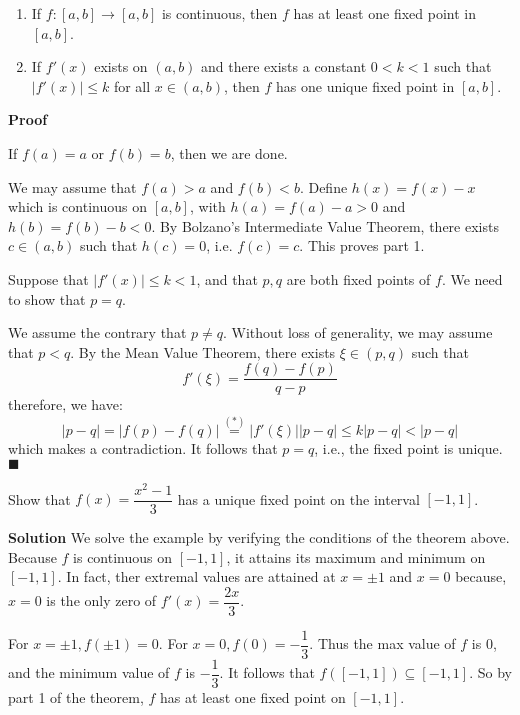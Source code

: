 \documentclass[main.tex]{subfiles}
\begin{document}
\begin{theorem}
    \begin{enumerate}
        \item If $f: [a, b] \rightarrow [a, b]$ is continuous, then $f$ has at least one fixed point in $[a, b]$.
        \item If $f'(x)$ exists on $(a, b)$ and there exists a constant $0 < k < 1$ such that $|f'(x)| \le k$ for all $x\in (a, b)$, then $f$ has one unique fixed point in $[a, b]$.
    \end{enumerate}
\end{theorem}
\par \noindent \textbf{Proof}
\par If $f(a) = a$ or $f(b) = b$, then we are done. 
\par We may assume that $f(a) > a$ and $f(b) < b$. Define $h(x) = f(x) - x$ which is continuous on $[a, b]$, with $h(a) = f(a) - a > 0$ and $h(b) = f(b) - b < 0$. By Bolzano's Intermediate Value Theorem, there exists $c\in (a, b)$ such that $h(c) = 0$, i.e. $f(c) = c$. This proves part 1.
\par Suppose that $|f'(x)|\le k < 1$, and that $p, q$ are both fixed points of $f$. We need to show that $p = q$. 
\par We assume the contrary that $p \neq q$. Without loss of generality, we may assume that $p < q$. By the Mean Value Theorem, there exists $\xi \in (p, q)$ such that
\begin{equation}
    f'(\xi) = \dfrac{f(q) - f(p)}{q - p}
\end{equation}
therefore, we have:
\begin{equation}
    |p - q| = |f(p) - f(q)| \overset{(*)}{=} |f'(\xi)||p - q| \le k |p - q| < |p - q|
\end{equation}
which makes a contradiction. It follows that $p = q$, i.e., the fixed point is unique. 
\\ \null \hfill $\blacksquare$ 
\begin{example}
    Show that $f(x) = \dfrac{x^2 - 1}{3}$ has a unique fixed point on the interval $[-1, 1]$.   
\end{example}
\par \noindent \textbf{Solution} We solve the example by verifying the conditions of the theorem above. Because $f$ is continuous on $[-1, 1]$, it attains its maximum and minimum on $[-1, 1]$. In fact, ther extremal values are attained at $x = \pm 1$ and $x = 0$ because, $x = 0$ is the only zero of $f'(x) = \dfrac{2x}{3}$. 
\par For $x = \pm 1, f(\pm 1) = 0$. For $x = 0, f(0) = -\dfrac{1}{3}$. Thus the max value of $f$ is $0$, and the minimum value of $f$ is $-\dfrac{1}{3}$. It follows that $f([-1, 1]) \subseteq [-1, 1]$. So by part 1 of the theorem, $f$ has at least one fixed point on $[-1, 1]$.
\end{document}
